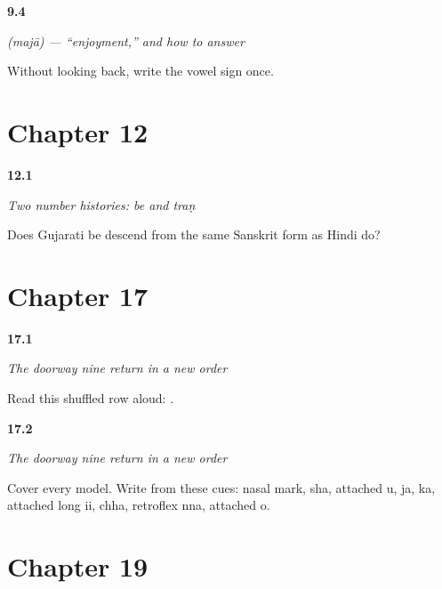 \noindent\begin{minipage}[t]{\linewidth}
\raggedright
\hypertarget{review-GU-C03-majaa-vocalic-r-retrieval}{\textbf{9.4}} \emph{ (majā) — \textquotedblleft{}enjoyment,\textquotedblright{} and how to answer}\par
\small Without looking back, write the vowel sign  once.
\end{minipage}\par\medskip

\section*{Chapter 12}

\noindent\begin{minipage}[t]{\linewidth}
\raggedright
\hypertarget{review-GU-C06-number-histories-be-source}{\textbf{12.1}} \emph{Two number histories: \emph{be} and \emph{traṇ}}\par
\small Does Gujarati be descend from the same Sanskrit form as Hindi do?
\end{minipage}\par\medskip

\section*{Chapter 17}

\noindent\begin{minipage}[t]{\linewidth}
\raggedright
\hypertarget{review-GU-R13-doorway-nine-r3-reading}{\textbf{17.1}} \emph{The doorway nine return in a new order}\par
\small Read this shuffled row aloud:         .
\end{minipage}\par\medskip

\noindent\begin{minipage}[t]{\linewidth}
\raggedright
\hypertarget{review-GU-R13-doorway-nine-r3-dictation}{\textbf{17.2}} \emph{The doorway nine return in a new order}\par
\small Cover every model. Write from these cues: nasal mark, sha, attached u, ja, ka, attached long ii, chha, retroflex nna, attached o.
\end{minipage}\par\medskip

\section*{Chapter 19}

